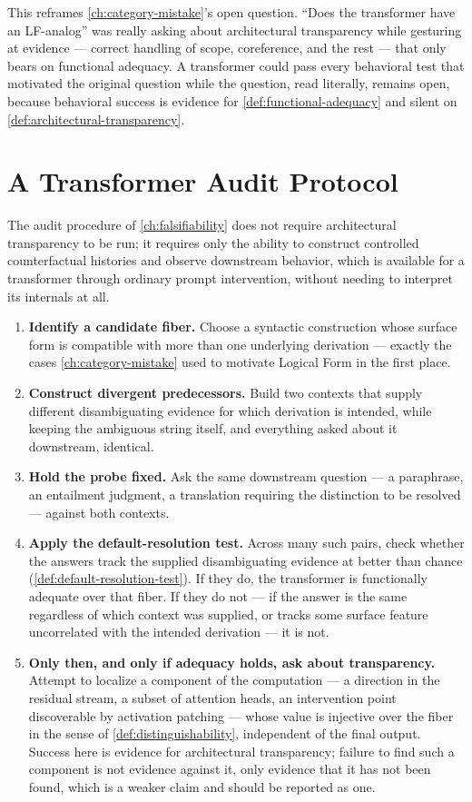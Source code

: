 \documentclass[11pt]{book}
\theoremstyle{plain}
\theoremstyle{definition}
\theoremstyle{remark}
\begin{document}
This reframes \cref{ch:category-mistake}'s open question. \enquote{Does
the transformer have an LF-analog} was really asking about
architectural transparency while gesturing at evidence --- correct
handling of scope, coreference, and the rest --- that only bears on
functional adequacy. A transformer could pass every behavioral test
that motivated the original question while the question, read
literally, remains open, because behavioral success is evidence for
\cref{def:functional-adequacy} and silent on
\cref{def:architectural-transparency}.

\section{A Transformer Audit Protocol}
\label{sec:transformer-protocol}

The audit procedure of \cref{ch:falsifiability} does not require
architectural transparency to be run; it requires only the ability to
construct controlled counterfactual histories and observe downstream
behavior, which is available for a transformer through ordinary prompt
intervention, without needing to interpret its internals at all.

\begin{enumerate}
\item \textbf{Identify a candidate fiber.} Choose a syntactic
construction whose surface form is compatible with more than one
underlying derivation --- exactly the cases
\cref{ch:category-mistake} used to motivate Logical Form in the first
place.
\item \textbf{Construct divergent predecessors.} Build two contexts
that supply different disambiguating evidence for which derivation is
intended, while keeping the ambiguous string itself, and everything
asked about it downstream, identical.
\item \textbf{Hold the probe fixed.} Ask the same downstream question
--- a paraphrase, an entailment judgment, a translation requiring the
distinction to be resolved --- against both contexts.
\item \textbf{Apply the default-resolution test.} Across many such
pairs, check whether the answers track the supplied disambiguating
evidence at better than chance
(\cref{def:default-resolution-test}). If they do, the transformer is
functionally adequate over that fiber. If they do not --- if the
answer is the same regardless of which context was supplied, or
tracks some surface feature uncorrelated with the intended derivation
--- it is not.
\item \textbf{Only then, and only if adequacy holds, ask about
transparency.} Attempt to localize a component of the computation ---
a direction in the residual stream, a subset of attention heads, an
intervention point discoverable by activation patching --- whose
value is injective over the fiber in the sense of
\cref{def:distinguishability}, independent of the final output. Success
here is evidence for architectural transparency; failure to find such
a component is not evidence against it, only evidence that it has not
been found, which is a weaker claim and should be reported as one.
\end{enumerate}
\end{document}
